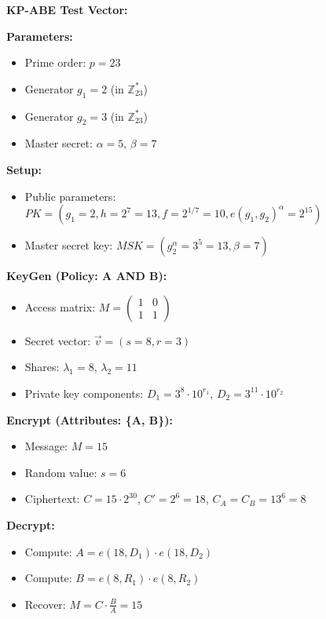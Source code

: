 \documentclass[11pt,a4paper]{article}
\begin{document}
\begin{examplebox}
\textbf{KP-ABE Test Vector:}

\textbf{Parameters:}
\begin{itemize}
    \item Prime order: $p = 23$
    \item Generator $g_1 = 2$ (in $\mathbb{Z}_{23}^*$)
    \item Generator $g_2 = 3$ (in $\mathbb{Z}_{23}^*$)
    \item Master secret: $\alpha = 5$, $\beta = 7$
\end{itemize}

\textbf{Setup:}
\begin{itemize}
    \item Public parameters: $PK = (g_1 = 2, h = 2^7 = 13, f = 2^{1/7} = 10, e(g_1, g_2)^\alpha = 2^{15})$
    \item Master secret key: $MSK = (g_2^\alpha = 3^5 = 13, \beta = 7)$
\end{itemize}

\textbf{KeyGen (Policy: A AND B):}
\begin{itemize}
    \item Access matrix: $M = \begin{pmatrix} 1 & 0 \\ 1 & 1 \end{pmatrix}$
    \item Secret vector: $\vec{v} = (s = 8, r = 3)$
    \item Shares: $\lambda_1 = 8$, $\lambda_2 = 11$
    \item Private key components: $D_1 = 3^8 \cdot 10^{r_1}$, $D_2 = 3^{11} \cdot 10^{r_2}$
\end{itemize}

\textbf{Encrypt (Attributes: \{A, B\}):}
\begin{itemize}
    \item Message: $M = 15$
    \item Random value: $s = 6$
    \item Ciphertext: $C = 15 \cdot 2^{30}$, $C' = 2^6 = 18$, $C_A = C_B = 13^6 = 8$
\end{itemize}

\textbf{Decrypt:}
\begin{itemize}
    \item Compute: $A = e(18, D_1) \cdot e(18, D_2)$
    \item Compute: $B = e(8, R_1) \cdot e(8, R_2)$
    \item Recover: $M = C \cdot \frac{B}{A} = 15$
\end{itemize}
\end{examplebox}
\end{document}
